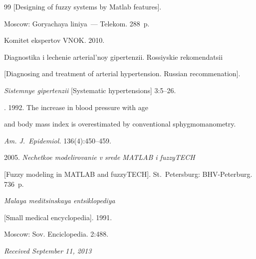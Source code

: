{{\begin{thebibliography}{99}
[{Designing of fuzzy systems by Matlab features}].


Moscow: Goryachaya liniya~--- Telekom. 288~p.




Komitet ekspertov VNOK. 2010.


Diagnostika i lechenie arterial'noy gipertenzii. Rossiyskie rekomendatsii


[Diagnosing and treatment of arterial hypertension. Russian recommenation].


\textit{Sistemnye gipertenzii} [{Systematic hypertensions}] 3:5--26.




. 1992. The increase in blood pressure with age


and body mass index is overestimated by conventional sphygmomanometry.


\textit{Am. J.~Epidemiol.} 136(4):450--459.




 2005. \textit{Nechetkoe modelirovanie v srede MATLAB i fuzzyTECH}


[{Fuzzy modeling in MATLAB and fuzzyTECH}]. St.\ Petersburg: BHV-Peterburg. 736~p.




 \textit{Malaya meditsinskaya entsiklopediya}


[{Small medical encyclopedia}]. 1991.


Moscow: Sov. Enciclopedia. 2:488.





 \end{thebibliography}


}}





\vspace*{-6pt}





\hfill{\small\textit{Received September 11, 2013}}





\vspace*{-6pt}





